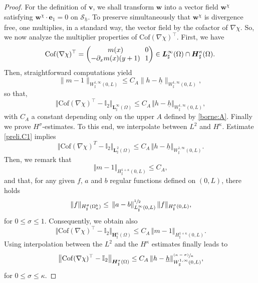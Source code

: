 \documentclass[11pt]{article}
\let\mathcal\mathscr
\newcommand{\psfrac}[2]{\sfrac{(#1)}{#2}}
\theoremstyle{remark}
\theoremstyle{definition}
\newcommand{\norme}[1]{\,\Vert #1\Vert}
\newcommand{\bnorme}[1]{\,\bigl\Vert #1\bigr\Vert}
\newcommand{\vg}{\boldsymbol{v}}
\newcommand{\wg}{\boldsymbol{w}}
\newcommand{\BS}[1]{\boldsymbol{#1}}
\let\CM\Omega
\newcommand{\hb}{{\underline{h}}}
\newcommand{\Cof}{\mathrm{Cof}}
\begin{document}
\begin{proof}
For the definition of $\vg$, we shall transform $\wg$ into a vector field $\wg^{\chi}$ satisfying $\wg^{\chi} \cdot \BS{e}_1 = 0$ on $\mathcal S_{\hb}$. To preserve simultaneously that $\wg^{\chi}$ is divergence free, one multiplies, in a standard way, the vector field by the cofactor of $\nabla \chi$. So, we now analyze the multiplier properties of $\Cof(\nabla\chi)^{\top}$. First, we have
\[\arraycolsep3.5pt
\Cof(\nabla\chi)^{\top} = \begin{pmatrix}
m(x)&0\\
-\partial_x m(x)(y+1)&1\\
\end{pmatrix} \in \BS{L}^\infty_\sharp(\Omega)\cap \BS{H}_\sharp^\kappa(\Omega).
\]
Then, straightforward computations yield
\begin{equation} \label{prelim.h}
\|m-1\|_{W^{1,\infty}_{\sharp}(0,L)} \leq C_A \|h-\underline{h}\|_{W^{1,\infty}_{\sharp}(0,L)},
\end{equation}
so that,
\begin{equation}\label{preli.C1}
\norme{\Cof(\nabla\chi)^{\top}-\mathbb I_2}_{\BS{L}^{\infty}_{\sharp}(\CM)}\leq C_A\norme{h-\hb}_{W^{1,\infty}_{\sharp}(0,L)},
\end{equation}
with $C_A$ a constant depending only on the upper $A$ defined by \eqref{borne:A}.
Finally we prove $H^{\sigma}$-estimates.
To this end, we interpolate between $L^2$ and $H^\kappa$. Estimate \eqref{preli.C1} implies
\[
\norme{\Cof(\nabla\chi)^{T}-\mathbb I_2}_{\BS{L}^{2}_{\sharp}(\CM)}\leq C_A\norme{h-\hb}_{W^{1,\infty}_{\sharp}(0,L)}.
\]
Then, we remark that
\[
\norme{m-1}_{H^{1+\kappa}_{\sharp}(0,L)}\leq C_{A},
\]
and that, for any given $f$, $a$ and $b$ regular functions defined on $(0,L)$, there holds
\begin{equation}\label{2D.1D.estimate}\norme{f}_{H_\sharp^{\sigma}(\Omega_{a}^{b})}\leq \norme{a-b}_{L_\sharp^{\infty}(0,L)}^{\sfrac{1}{2}}\norme{f}_{H_\sharp^{\sigma}(0,L)},
\end{equation}
for $0\leq \sigma\leq 1$. Consequently, we obtain also
\[\bnorme{\Cof(\nabla\chi)^{\top}-\mathbb I_2}_{\BS{H}^{\kappa}_{\sharp}(\CM)}\leq C_A\norme{m-1}_{H^{1+\kappa}_{\sharp}(0,L)}.
\]
Using interpolation between the $L^{2}$ and the $H^{\kappa}$ estimates finally leads to
\begin{equation}\label{preli.Hs}\bnorme{\Cof(\nabla\chi)^{\top}-\mathbb I_2}_{\BS{H}^{\sigma}_{\sharp}(\CM)}\leq C_A \norme{h-\hb}_{W^{1,\infty}_{\sharp}(0,L)}^{\psfrac{\kappa-\sigma}{\kappa}},
\end{equation}
for $0\leq \sigma\leq \kappa$.


\end{proof}
\end{document}
